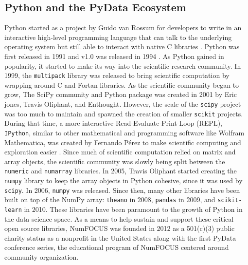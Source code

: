 \documentclass[010-intro.tex]{subfiles}
\begin{document}
    \subsection{Python and the PyData Ecosystem}

        Python started as a project by Guido van Rossum for developers to write in an interactive high-level programming language that can
        talk to the underlying operating system but still able to interact with native C libraries
        \cite{severanceGuidoVanRossum2005}.
        Python was first released in 1991 and v1.0 was released in 1994
        \cite{severanceGuidoVanRossum2005}.
        As Python gained in popularity, it started to make its way into the scientific research community.
        In 1999, the \lstinline{multipack} library was released to bring scientific computation by wrapping around C and Fortan libraries.
        As the scientific community began to grow,
        The SciPy community and Python package was created in 2001 by Eric jones, Travis Oliphant, and Enthought.
        However, the scale of the \lstinline{scipy} project was too much to maintain
        and spawned the creation of smaller \lstinline{scikit} projects.
        During that time,
        a more interactive Read-Evaluate-Print-Loop (REPL),
        \lstinline{IPython},
        similar to other mathematical and programming software like Wolfram Mathematica,
        was created by Fernando Pérez to make scientific computing and exploration easier
        \cite{iPythondevelopmentteamHistory}.
        Since much of scientific computation relied on matrix and array objects,
        the scientific community was slowly being split between the \lstinline{numeric} and \lstinline{numarray} libraries.
        In 2005, Travis Oliphant started creating the \lstinline{numpy} library to keep the array objects in Python cohesive,
        since it was used by \lstinline{scipy}.
        In 2006, \lstinline{numpy} was released.
        Since then, many other libraries have been built on top of the NumPy array:
        \lstinline{theano} in 2008, \lstinline{pandas} in 2009, and \lstinline{scikit-learn} in 2010.
        These libraries have been paramount to the growth of Python in the data science space. %
        As a means to help sustain and support these critical open source libraries,
        NumFOCUS was founded in 2012 as a 501(c)(3) public charity status as a nonprofit in the United States along with the first PyData
        conference series, the educational program of NumFOCUS centered around community organization.
\end{document}

